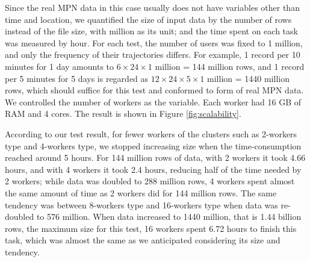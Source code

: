 \documentclass[12pt]{article}
\theoremstyle{definition}
\begin{document}
Since the real MPN data in this case usually does not have variables other than time and location, we quantified the size of input data by the number of rows instead of the file size, with million as its unit; and the time spent on each task was measured by hour. For each test, the number of users was fixed to 1 million, and only the frequency of their trajectories differs. For example, 1 record per 10 minutes for 1 day amounts to \(6 \times 24 \times 1\) million = 144 million rows, and 1 record per 5 minutes for 5 days is regarded as \(12 \times 24 \times 5 \times 1\) million = 1440 million rows, which should suffice for this test and conformed to form of real MPN data. We controlled the number of workers as the variable. Each worker had 16 GB of RAM and 4 cores. The result is shown in Figure \ref{fig:scalability}.



According to our test result, for fewer workers of the clusters such as 2-workers type and 4-workers type, we stopped increasing size when the time-consumption reached around 5 hours. For 144 million rows of data, with 2 workers it took 4.66 hours, and with 4 workers it took 2.4 hours, reducing half of the time needed by 2 workers; while data was doubled to 288 million rows, 4 workers spent almost the same amount of time as 2 workers did for 144 million rows. The same tendency was between 8-workers type and 16-workers type when data was re-doubled to 576 million. When data increased to 1440 million, that is 1.44 billion rows, the maximum size for this test, 16 workers spent 6.72 hours to finish this task, which was almost the same as we anticipated considering its size and tendency. 
\end{document}
